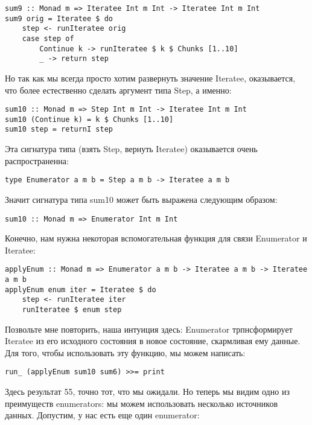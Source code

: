 \begin{lstlisting}
sum9 :: Monad m => Iteratee Int m Int -> Iteratee Int m Int
sum9 orig = Iteratee $ do
    step <- runIteratee orig
    case step of
        Continue k -> runIteratee $ k $ Chunks [1..10]
        _ -> return step
\end{lstlisting}

Но так как мы всегда просто хотим развернуть значение Iteratee, оказывается, что более естественно сделать аргумент типа Step, а именно:

\begin{lstlisting}
sum10 :: Monad m => Step Int m Int -> Iteratee Int m Int
sum10 (Continue k) = k $ Chunks [1..10]
sum10 step = returnI step
\end{lstlisting}

Эта сигнатура типа (взять Step, вернуть Iteratee) оказывается очень распространенна:

\begin{lstlisting}
type Enumerator a m b = Step a m b -> Iteratee a m b
\end{lstlisting}

Значит сигнатура типа sum10 может быть выражена следующим образом:

\begin{lstlisting}
sum10 :: Monad m => Enumerator Int m Int
\end{lstlisting}

Конечно, нам нужна некоторая вспомогательная функция для связи Enumerator и Iteratee:

\begin{lstlisting}
applyEnum :: Monad m => Enumerator a m b -> Iteratee a m b -> Iteratee a m b
applyEnum enum iter = Iteratee $ do
    step <- runIteratee iter
    runIteratee $ enum step
\end{lstlisting}

Позвольте мне повторить, наша интуиция здесь: Enumerator трпнсформирует Iteratee из его исходного состояния в новое состояние, скармливая ему данные. Для того, чтобы использовать эту функцию, мы можем написать:

\begin{lstlisting}
run_ (applyEnum sum10 sum6) >>= print
\end{lstlisting}

Здесь результат 55, точно тот, что мы ожидали. Но теперь мы видим одно из преимуществ enumerators: мы можем использовать несколько источников данных. Допустим, у нас есть еще один enumerator:

